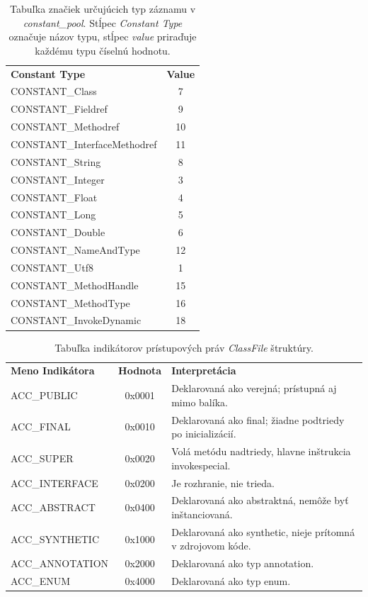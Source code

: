 \documentclass[11pt,final,oneside]{fithesis}
\begin{document}
\begin{table}
  \begin{tabular}{| l | c |}
    \hline
    \textbf{Constant Type} & \textbf{Value} \\
    \hhline{|=|=|}
    CONSTANT\_Class & 7 \\ \hline
    CONSTANT\_Fieldref & 9 \\ \hline
    CONSTANT\_Methodref & 10 \\ \hline
    CONSTANT\_InterfaceMethodref & 11 \\ \hline
    CONSTANT\_String & 8 \\ \hline
    CONSTANT\_Integer & 3 \\ \hline
    CONSTANT\_Float & 4 \\ \hline
    CONSTANT\_Long & 5 \\ \hline
    CONSTANT\_Double & 6 \\ \hline
    CONSTANT\_NameAndType & 12 \\ \hline
    CONSTANT\_Utf8 & 1 \\ \hline
    CONSTANT\_MethodHandle & 15 \\ \hline
    CONSTANT\_MethodType & 16 \\ \hline
    CONSTANT\_InvokeDynamic & 18 \\
    \hline
  \end{tabular}
  \caption{Tabuľka značiek určujúcich typ záznamu v \textit{constant\_pool}.
  Stĺpec \textit{Constant Type} označuje názov typu, stĺpec \textit{value}
  priraďuje každému typu číselnú hodnotu.}
  \label{tab:tab1}
\end{table}

\begin{table}
  \begin{tabular}{| l | c | p{6cm} |}
    \hline
    \textbf{Meno Indikátora} & \textbf{Hodnota} & \textbf{Interpretácia} \\
    \hhline{|=|=|=|}
    ACC\_PUBLIC & 0x0001 & Deklarovaná ako verejná; prístupná aj mimo balíka.
    \\ \hline
    ACC\_FINAL & 0x0010 & Deklarovaná ako final; žiadne podtriedy po 
    inicializácií. \\ \hline
    ACC\_SUPER & 0x0020 & Volá metódu nadtriedy, hlavne inštrukcia 
    invokespecial. \\ \hline
    ACC\_INTERFACE & 0x0200 & Je rozhranie, nie trieda.\\ \hline
    ACC\_ABSTRACT & 0x0400 & Deklarovaná ako abstraktná, nemôže byť 
    inštanciovaná. \\ \hline
    ACC\_SYNTHETIC & 0x1000 & Deklarovaná ako synthetic, nieje prítomná v 
    zdrojovom kóde. \\ \hline
    ACC\_ANNOTATION & 0x2000 & Deklarovaná ako typ annotation. \\ \hline
    ACC\_ENUM & 0x4000 & Deklarovaná ako typ enum. \\    
    \hline
  \end{tabular}
  \caption{Tabuľka indikátorov prístupových práv \textit{ClassFile} štruktúry.}
  \label{tab:tab2}
\end{table}
\end{document}
